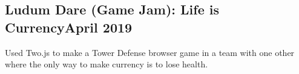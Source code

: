 \documentclass[../Resume.tex]{subfiles}
\begin{document}
    \subsection{Ludum Dare (Game Jam): Life is Currency\null\hfill April 2019}
    \par Used Two.js to make a Tower Defense browser game in a team with one other where the only way to make currency is to lose health.
    \vspace*{-2mm}
\end{document}
